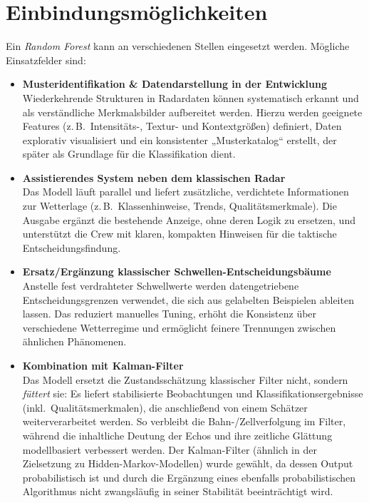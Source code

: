 \section{Einbindungsmöglichkeiten}
Ein \emph{Random Forest} kann an verschiedenen Stellen eingesetzt werden. Mögliche Einsatzfelder sind:

\begin{itemize}
  \item \textbf{Musteridentifikation \& Datendarstellung in der Entwicklung}\\
  Wiederkehrende Strukturen in Radardaten können systematisch erkannt und als
  verständliche Merkmalsbilder aufbereitet werden. Hierzu werden geeignete Features (z.\,B.\ Intensitäts-, Textur-
  und Kontextgrößen) definiert, Daten explorativ visualisiert und ein konsistenter „Musterkatalog“ erstellt,
  der später als Grundlage für die Klassifikation dient.

  \item \textbf{Assistierendes System neben dem klassischen Radar}\\
  Das Modell läuft parallel und liefert zusätzliche, verdichtete Informationen zur Wetterlage
  (z.\,B.\ Klassenhinweise, Trends, Qualitätsmerkmale). Die Ausgabe ergänzt die bestehende Anzeige,
  ohne deren Logik zu ersetzen, und unterstützt die Crew mit klaren, kompakten Hinweisen für die
  taktische Entscheidungsfindung.

  \item \textbf{Ersatz/Ergänzung klassischer Schwellen-Entscheidungsbäume}\\
  Anstelle fest verdrahteter Schwellwerte werden datengetriebene Entscheidungsgrenzen verwendet,
  die sich aus gelabelten Beispielen ableiten lassen. Das reduziert manuelles Tuning, erhöht die
  Konsistenz über verschiedene Wetterregime und ermöglicht feinere Trennungen zwischen ähnlichen Phänomenen.

  \item \textbf{Kombination mit Kalman-Filter}\\
  Das Modell ersetzt die Zustandsschätzung klassischer Filter nicht, sondern \emph{füttert} sie:
  Es liefert stabilisierte Beobachtungen und Klassifikationsergebnisse (inkl.\ Qualitätsmerkmalen),
  die anschließend von einem Schätzer weiterverarbeitet werden. So verbleibt die Bahn-/Zellverfolgung im
  Filter, während die inhaltliche Deutung der Echos und ihre zeitliche Glättung modellbasiert verbessert werden.
  Der Kalman-Filter (ähnlich in der Zielsetzung zu Hidden-Markov-Modellen) wurde gewählt, da dessen Output
  probabilistisch ist und durch die Ergänzung eines ebenfalls probabilistischen Algorithmus nicht
  zwangsläufig in seiner Stabilität beeinträchtigt wird.
\end{itemize}

